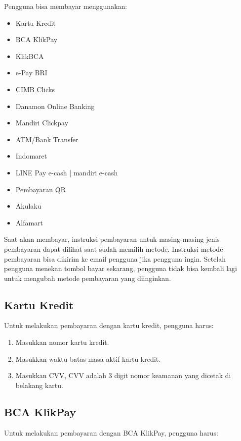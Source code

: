 Pengguna bisa membayar menggunakan:
\begin{itemize}
    \item Kartu Kredit
    \item BCA KlikPay
    \item KlikBCA
    \item e-Pay BRI
    \item CIMB Clicks
    \item Danamon Online Banking
    \item Mandiri Clickpay
    \item ATM/Bank Transfer
    \item Indomaret
    \item LINE Pay e-cash | mandiri e-cash
    \item Pembayaran QR
    \item Akulaku
    \item Alfamart
\end{itemize}

Saat akan membayar, instruksi pembayaran untuk masing-masing jenis pembayaran dapat dilihat saat sudah memilih metode. Instruksi metode pembayaran bisa dikirim ke email pengguna jika pengguna ingin. Setelah pengguna menekan tombol bayar sekarang, pengguna tidak bisa kembali lagi untuk mengubah metode pembayaran yang diinginkan.

\subsection{Kartu Kredit}
\label{subsec:kartukredit}
Untuk melakukan pembayaran dengan kartu kredit, pengguna harus:

\begin{enumerate}
    \item Masukkan nomor kartu kredit.
    \item Masukkan waktu batas masa aktif kartu kredit.
    \item Masukkan CVV, CVV adalah 3 digit nomor keamanan yang dicetak di belakang kartu.
\end{enumerate}

\subsection{BCA KlikPay}
\label{subsec:bcaklikpay}
Untuk melakukan pembayaran dengan BCA KlikPay, pengguna harus:


